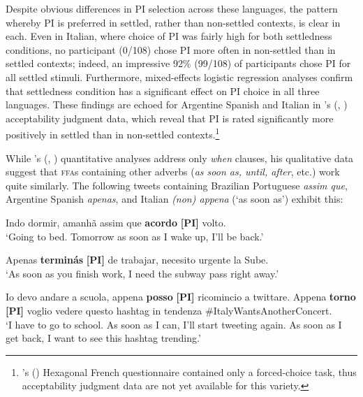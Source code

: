 \documentclass[output=paper,colorlinks,citecolor=brown]{langscibook}
\begin{document}
Despite obvious differences in PI selection across these languages, the pattern whereby PI is preferred in settled, rather than non-settled contexts, is clear in each. Even in Italian, where choice of PI was fairly high for both settledness conditions, no participant (0/108) chose PI more often in non-settled than in settled contexts; indeed, an impressive 92\% (99/108) of participants chose PI for all settled stimuli. Furthermore, mixed-effects logistic regression analyses confirm that settledness condition has a significant effect on PI choice in all three languages. These findings are echoed for Argentine Spanish and Italian in \citeauthor{Hoff2019}’s (\citeyear{Hoff2019}, \citeyear{Hoff2020}) acceptability judgment data, which reveal that PI is rated significantly more positively in settled than in non-settled contexts.\footnote{\citeauthor{HoffForthcoming}’s (\citeyear{HoffForthcoming}) Hexagonal French questionnaire contained only a forced-choice task, thus acceptability judgment data are not yet available for this variety.}

While \citeauthor{Hoff2019}’s (\citeyear{Hoff2019}, \citeyear{Hoff2020}) quantitative analyses address only \textit{when} clauses, his qualitative data suggest that \textsc{ffa}s containing other adverbs (\textit{as soon as, until, after}, etc.) work quite similarly. The following tweets containing Brazilian Portuguese \textit{assim que}, Argentine Spanish \textit{apenas}, and Italian \textit{(non) appena} (`as soon as') exhibit this:

\begin{exe}
\ex\label{ex:hoff:assimqueacordo} Indo dormir, amanhã assim que \textbf{acordo} \textbf{[PI]} volto. \\
`Going to bed. Tomorrow as soon as I wake up, I’ll be back.'
\end{exe}

\begin{exe}
\ex\label{ex:hoff:apenasterminas} Apenas \textbf{terminás} \textbf{[PI]} de trabajar, necesito urgente la Sube. \\
`As soon as you finish work, I need the subway pass right away.'
\end{exe}

\begin{exe}
\ex\label{ex:hoff:appenaposso} Io devo andare a scuola, appena \textbf{posso} \textbf{[PI]} ricomincio a twittare. Appena \textbf{torno} \textbf{[PI]} voglio vedere questo hashtag in tendenza \#ItalyWantsAnotherConcert. \\
`I have to go to school. As soon as I can, I’ll start tweeting again. As soon as I get back, I want to see this hashtag trending.'
\end{exe}
\end{document}
